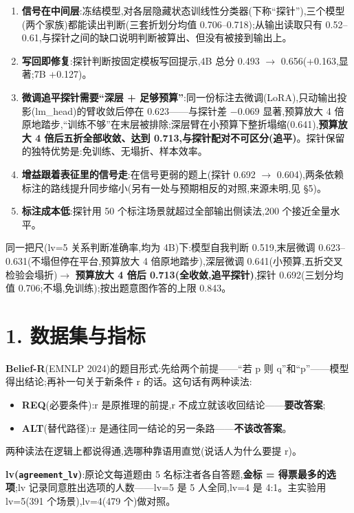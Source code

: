 \documentclass[fontset=none,10.5pt]{ctexart}
\begin{document}
\begin{enumerate}
\item \textbf{信号在中间层}:冻结模型,对各层隐藏状态训线性分类器(下称``探针''),三个模型(两个家族)都能读出判断(三套折划分均值 0.706--0.718);从输出读取只有 0.52--0.61,与探针之间的缺口说明判断被算出、但没有被接到输出上。
\item \textbf{写回即修复}:探针判断按固定模板写回提示,4B 总分 0.493 $\to$ 0.656(+0.163,显著;7B +0.127)。
\item \textbf{微调追平探针需要``深层 + 足够预算''}:同一份标注去微调(LoRA),只动输出投影(lm\_head)的臂收敛后停在 0.623——与探针差 $-0.069$ 显著,预算放大 4 倍原地踏步,``训练不够''在末层被排除;深层臂在小预算下整折塌缩(0.641),\textbf{预算放大 4 倍后五折全部收敛、达到 0.713,与探针配对不可区分(追平)}。探针保留的独特优势是:免训练、无塌折、样本效率。
\item \textbf{增益跟着表征里的信号走}:在信号更弱的题上(探针 0.692 $\to$ 0.604),两条依赖标注的路线提升同步缩小(另有一处与预期相反的对照,来源未明,见 \S 5)。
\item \textbf{标注成本低}:探针用 50 个标注场景就超过全部输出侧读法,200 个接近全量水平。
\end{enumerate}

同一把尺(lv=5 关系判断准确率,均为 4B)下:模型自我判断 0.519,末层微调 0.623--0.631(不塌但停在平台,预算放大 4 倍原地踏步),深层微调 0.641(小预算,五折交叉检验会塌折)$\to$ \textbf{预算放大 4 倍后 0.713(全收敛,追平探针)},探针 0.692(三划分均值 0.706;不塌,免训练);按出题意图作答的上限 0.843。

\section*{1. 数据集与指标}

\textbf{Belief-R}(EMNLP 2024)的题目形式:先给两个前提——``若 p 则 q''和``p''——模型得出结论;再补一句关于新条件 r 的话。这句话有两种读法:

\begin{itemize}
\item \textbf{REQ}(必要条件):r 是原推理的前提,r 不成立就该收回结论——\textbf{要改答案};
\item \textbf{ALT}(替代路径):r 是通往同一结论的另一条路——\textbf{不该改答案}。
\end{itemize}

两种读法在逻辑上都说得通,选哪种靠语用直觉(说话人为什么要提 r)。

\textbf{lv(\texttt{agreement\_lv})}:原论文每道题由 5 名标注者各自答题,\textbf{金标 = 得票最多的选项};lv 记录同意胜出选项的人数——lv=5 是 5 人全同,lv=4 是 4:1。主实验用 lv=5(391 个场景),lv=4(479 个)做对照。
\end{document}
